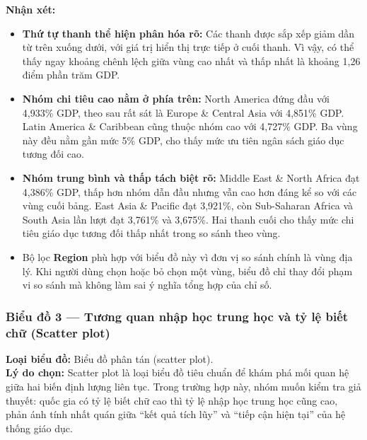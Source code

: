 \textbf{Nhận xét:}
\begin{itemize}
    \item \textbf{Thứ tự thanh thể hiện phân hóa rõ:} Các thanh được sắp xếp giảm dần từ trên xuống dưới, với giá trị hiển thị trực tiếp ở cuối thanh. Vì vậy, có thể thấy ngay khoảng chênh lệch giữa vùng cao nhất và thấp nhất là khoảng 1,26 điểm phần trăm GDP.
    \item \textbf{Nhóm chi tiêu cao nằm ở phía trên:} North America đứng đầu với 4,933\% GDP, theo sau rất sát là Europe \& Central Asia với 4,851\% GDP. Latin America \& Caribbean cũng thuộc nhóm cao với 4,727\% GDP. Ba vùng này đều nằm gần mức 5\% GDP, cho thấy mức ưu tiên ngân sách giáo dục tương đối cao.
    \item \textbf{Nhóm trung bình và thấp tách biệt rõ:} Middle East \& North Africa đạt 4,386\% GDP, thấp hơn nhóm dẫn đầu nhưng vẫn cao hơn đáng kể so với các vùng cuối bảng. East Asia \& Pacific đạt 3,921\%, còn Sub-Saharan Africa và South Asia lần lượt đạt 3,761\% và 3,675\%. Hai thanh cuối cho thấy mức chi tiêu giáo dục tương đối thấp nhất trong so sánh theo vùng.
    \item Bộ lọc \textbf{Region} phù hợp với biểu đồ này vì đơn vị so sánh chính là vùng địa lý. Khi người dùng chọn hoặc bỏ chọn một vùng, biểu đồ chỉ thay đổi phạm vi so sánh mà không làm sai ý nghĩa tổng hợp của chỉ số.
\end{itemize}

\subsubsection{Biểu đồ 3 --- Tương quan nhập học trung học và tỷ lệ biết chữ (Scatter plot)}

\textbf{Loại biểu đồ:} Biểu đồ phân tán (scatter plot).\\
\textbf{Lý do chọn:} Scatter plot là loại biểu đồ tiêu chuẩn để khám phá mối quan hệ giữa hai biến định lượng liên tục. Trong trường hợp này, nhóm muốn kiểm tra giả thuyết: quốc gia có tỷ lệ biết chữ cao thì tỷ lệ nhập học trung học cũng cao, phản ánh tính nhất quán giữa ``kết quả tích lũy'' và ``tiếp cận hiện tại'' của hệ thống giáo dục.


